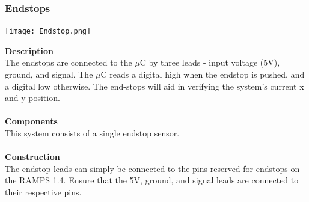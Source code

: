 \documentclass[titlepage]{article}
\begin{document}
\subsubsection{Endstops}
\begin{center}
	\texttt{[image: Endstop.png]}
\label{fig:elecContextDiagramFig}
\end{center}
\textbf{Description}\\
The endstops are connected to the $\mu$C by three leads - input voltage (5V), ground, and signal. The $\mu$C reads a digital high when the endstop is pushed, and a digital low otherwise. The end-stops will aid in verifying the system's current x and y position.\\\\
\textbf{Components}\\
This system consists of a single endstop sensor.\\\\
\textbf{Construction}\\
The endstop leads can simply be connected to the pins reserved for endstops on the RAMPS 1.4. Ensure that the 5V, ground, and signal leads are connected to their respective pins.

\newpage
\end{document}
